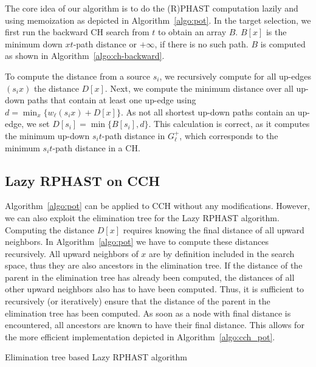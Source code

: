 \documentclass[manuscript,review]{acmart}
\begin{document}
The core idea of our algorithm is to do the (R)PHAST computation lazily and using memoization as depicted in Algorithm~\ref{algo:pot}.
In the target selection, we first run the backward CH search from $t$ to obtain an array $B$.
$B[x]$ is the minimum down $xt$-path distance or $+\infty$, if there is no such path.
$B$ is computed as shown in Algorithm~\ref{algo:ch-backward}.

To compute the distance from a source $s_i$, we recursively compute for all up-edges $(s_i x)$ the distance $D[x]$.
Next, we compute the minimum distance over all up-down paths that contain at least one up-edge using $d = \min_x\{w_\ell(s_i x) + D[x]\}$.
As not all shortest up-down paths contain an up-edge, we set $D[s_i] = \min \{ B[s_i], d \}$.
This calculation is correct, as it computes the minimum up-down $s_it$-path distance in $G^+_\ell$, which corresponds to the minimum $s_it$-path distance in a CH.

\subsection{Lazy RPHAST on CCH}

Algorithm~\ref{algo:pot} can be applied to CCH without any modifications.
However, we can also exploit the elimination tree for the Lazy RPHAST algorithm.
Computing the distance $D[x]$ requires knowing the final distance of all upward neighbors.
In Algorithm~\ref{algo:pot} we have to compute these distances recursively.
All upward neighbors of $x$ are by definition included in the search space, thus they are also ancestors in the elimination tree.
If the distance of the parent in the elimination tree has already been computed, the distances of all other upward neighbors also has to have been computed.
Thus, it is sufficient to recursively (or iteratively) ensure that the distance of the parent in the elimination tree has been computed.
As soon as a node with final distance is encountered, all ancestors are known to have their final distance.
This allows for the more efficient implementation depicted in Algorithm~\ref{algo:cch_pot}.

\begin{algorithm2e}
\caption{Elimination tree based Lazy RPHAST algorithm}
\label{algo:cch_pot}
\end{algorithm2e}
\end{document}
